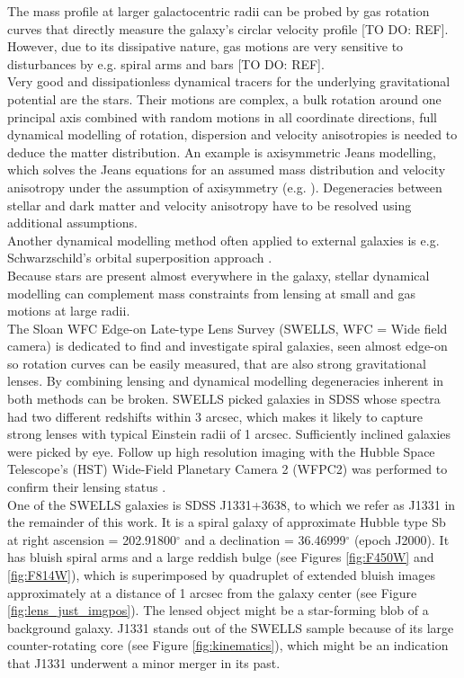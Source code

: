 The mass profile at larger galactocentric radii can be probed by gas rotation curves that directly measure the galaxy's circlar velocity profile [TO DO: REF]. However, due to its dissipative nature, gas motions are very sensitive to disturbances by e.g. spiral arms and bars [TO DO: REF].\\
Very good and dissipationless dynamical tracers for the underlying gravitational potential are the stars. Their motions are complex, a bulk rotation around one principal axis combined with random motions in all coordinate directions, full dynamical modelling of rotation, dispersion and velocity anisotropies is needed to deduce the matter distribution. An example is axisymmetric Jeans modelling, which solves the Jeans equations for an assumed mass distribution and velocity anisotropy under the assumption of axisymmetry (e.g. \citealt{Cap08}). Degeneracies between stellar and dark matter and velocity anisotropy have to be resolved using additional assumptions.\\
Another dynamical modelling method often applied to external galaxies is e.g. Schwarzschild's orbital superposition approach \citep{schwarzschild}.\\
Because stars are present almost everywhere in the galaxy, stellar dynamical modelling can complement mass constraints from lensing at small and gas motions at large radii.\\

The Sloan WFC Edge-on Late-type Lens Survey (SWELLS, WFC = Wide field camera) \citep{SWELLSI,SWELLSII,SWELLSIII,SWELLSIV,SWELLSV,SWELLSVI} is dedicated to find and investigate spiral galaxies, seen almost edge-on so rotation curves can be easily measured, that are also strong gravitational lenses. By combining lensing and dynamical modelling degeneracies inherent in both methods can be broken. SWELLS picked galaxies in SDSS whose spectra had two different redshifts within 3 arcsec, which makes it likely to capture strong lenses with typical Einstein radii of 1 arcsec. Sufficiently inclined galaxies were picked by eye. Follow up high resolution imaging with the Hubble Space Telescope's (HST) Wide-Field Planetary Camera 2 (WFPC2) was performed to confirm their lensing status \citep{SWELLSI}.\\

One of the SWELLS galaxies is SDSS J1331+3638, to which we refer as J1331 in the remainder of this work. It is a spiral galaxy of approximate Hubble type Sb at right ascension = 202.91800$^\circ$ and a declination = 36.46999$^\circ$ (epoch J2000). It has bluish spiral arms and a large reddish bulge (see Figures \ref{fig:F450W} and \ref{fig:F814W}), which is superimposed by quadruplet of extended bluish images approximately at a distance of 1 arcsec from the galaxy center (see Figure \ref{fig:lens_just_imgpos}). The lensed object might be a star-forming blob of a background galaxy. J1331 stands out of the SWELLS sample because of its large counter-rotating core (see Figure \ref{fig:kinematics}), which might be an indication that J1331 underwent a minor merger in its past.\\

